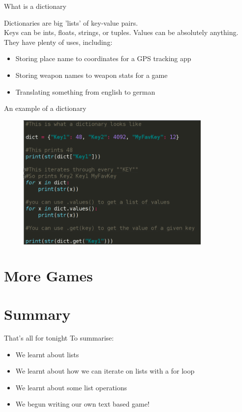 \documentclass{beamer}
\begin{document}
\begin{frame}{What is a dictionary}

Dictionaries are big 'lists' of key-value pairs.\\ \pause
Keys can be ints, floats, strings, or tuples. Values can be absolutely anything.\\ \pause
They have plenty of uses, including:

  \begin{itemize}
  \item Storing place name to coordinates for a GPS tracking app\pause
  \item Storing weapon names to weapon stats for a game\pause
  \item Translating something from english to german
  \end{itemize}

\end{frame}

\begin{frame}{An example of a dictionary}

\begin{figure}[h]
\includegraphics[width=0.85\textwidth]{dict}
\end{figure}

\end{frame}

\section{More Games}

\section{Summary}

\begin{frame}{That's all for tonight}
  To summarise:
  \pause
  \begin{itemize}
  \item We learnt about lists\pause
  \item We learnt about how we can iterate on lists with a for loop\pause
  \item We learnt about some list operations\pause
  \item We begun writing our own text based game!
  \end{itemize}
\end{frame}
\end{document}
